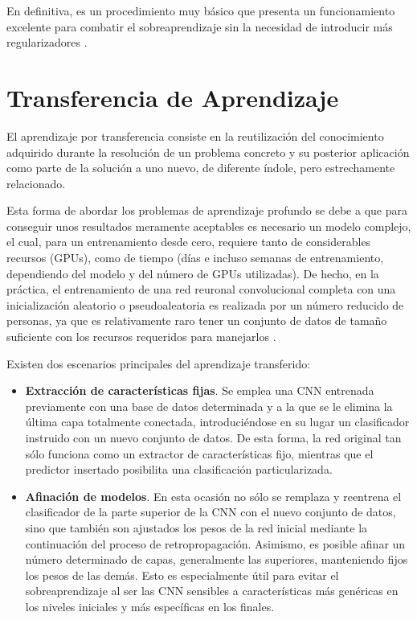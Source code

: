 En definitiva, es un procedimiento muy básico que presenta un funcionamiento excelente para combatir el sobreaprendizaje sin la necesidad de introducir más regularizadores \cite{CS231n}.

\section{Transferencia de Aprendizaje} \label{Chapter:TransferLearning}

El aprendizaje por transferencia consiste en la reutilización del conocimiento adquirido durante la resolución de un problema concreto y su posterior aplicación como parte de la solución a uno nuevo, de diferente índole, pero estrechamente relacionado.

Esta forma de abordar los problemas de aprendizaje profundo se debe a que para conseguir unos resultados meramente aceptables es necesario un modelo complejo, el cual, para un entrenamiento desde cero, requiere tanto de considerables recursos (GPUs), como de tiempo (días e incluso semanas de entrenamiento, dependiendo del modelo y del número de GPUs utilizadas). De hecho, en la práctica, el entrenamiento de una red reuronal convolucional completa con una inicialización aleatorio o pseudoaleatoria es realizada por un número reducido de personas, ya que es relativamente raro tener un conjunto de datos de tamaño suficiente con los recursos requeridos para manejarlos \cite{CS231n}.  

Existen dos escenarios principales del aprendizaje transferido:
\begin{itemize}
  \item \textbf{Extracción de características fijas}. Se emplea una CNN entrenada previamente con una base de datos determinada y a la que se le elimina la última capa totalmente conectada, introduciéndose en su lugar un clasificador instruido con un nuevo conjunto de datos. De esta forma, la red original tan sólo funciona como un extractor de características fijo, mientras que el predictor insertado posibilita una clasificación particularizada.
  \item \textbf{Afinación de modelos}. En esta ocasión no sólo se remplaza y reentrena el clasificador de la parte superior de la CNN con el nuevo conjunto de datos, sino que también son ajustados los pesos de la red inicial mediante la continuación del proceso de retropropagación. Asimismo, es posible afinar un número determinado de capas, generalmente las superiores, manteniendo fijos los pesos de las demás. Esto es especialmente útil para evitar el sobreaprendizaje al ser las CNN sensibles a características más genéricas en los niveles iniciales y más específicas en los finales.
\end{itemize}

